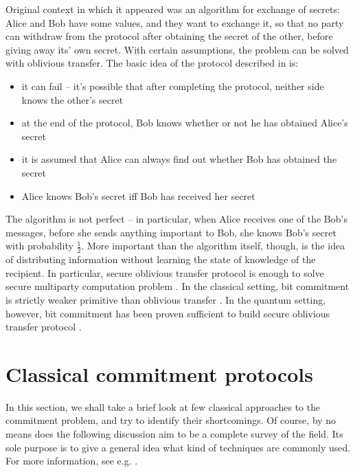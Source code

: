 \documentclass[10pt]{article}
\begin{document}
Original context in which it appeared was an algorithm for exchange of secrets: Alice and Bob have some
values, and they want to exchange it, so that no party can withdraw from the protocol after obtaining
the secret of the other, before giving away its' own secret. With certain assumptions, the problem
can be solved with oblivious transfer. The basic idea of the protocol described in \cite{Rabin81} is:

\begin{itemize}
  \item it can fail -- it's possible that after completing the protocol, neither side knows 
    the other's secret
  \item at the end of the protocol, Bob knows whether or not he has obtained Alice's secret
  \item it is assumed that Alice can always find out whether Bob has obtained the secret
  \item Alice knows Bob's secret iff Bob has received her secret
\end{itemize}

The algorithm is not perfect -- in particular, when Alice receives one of the Bob's messages, before
she sends anything important to Bob, she knows Bob's secret with probability \(\frac{1}{2}\). More
important than the algorithm itself, though, is the idea of distributing information without learning
the state of knowledge of the recipient. In particular, secure oblivious transfer protocol is enough
to solve secure multiparty computation problem \cite{Kilian88}. In the classical setting, bit commitment
is strictly weaker primitive than oblivious transfer \cite{Brassard88}. In the quantum setting, however,
bit commitment has been proven sufficient to build secure oblivious transfer protocol 
\cite{Crepeau88,Bennet92,Yao95,Damgard09}.
\footnotemark



\section{Classical commitment protocols}

In this section, we shall take a brief look at few classical approaches to the commitment problem,
and try to identify their shortcomings. Of course, by no means does the following discussion aim
to be a complete survey of the field. Its sole purpose is to give a general idea what kind of 
techniques are commonly used. For more information, see e.g. \cite{Brassard88,Naor91,Naor98,Damgard02}.
\end{document}
